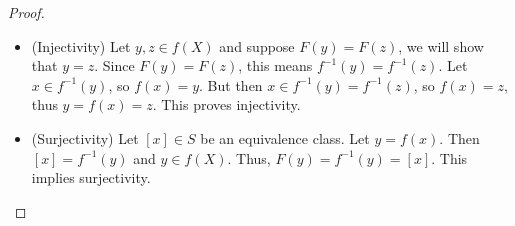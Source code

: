 \documentclass[a4paper,12pt,dvipsnames]{book}
\numberwithin{theorem}{chapter}
\theoremstyle{remark}
\begin{document}
\begin{enumerate}
\begin{solution}
\begin{proof}
\begin{itemize}
\item (Injectivity) Let $y,z\in f(X)$ and suppose $F(y)=F(z)$, we will show that $y=z$. Since $F(y)=F(z)$, this means $f^{-1}(y)=f^{-1}(z)$. Let $x\in f^{-1}(y)$, so $f(x)=y$. But then $x\in f^{-1}(y)=f^{-1}(z)$, so $f(x)=z$, thus $y=f(x)=z$. This proves injectivity. 
\item (Surjectivity) Let $[x]\in S$ be an equivalence class. Let $y=f(x)$. Then $[x]=f^{-1}(y)$ and $y\in f(X)$. Thus, $F(y)=f^{-1}(y)=[x]$. This implies surjectivity. 
\end{itemize} 
\end{proof}





\end{solution}



\end{enumerate}
\end{document}
